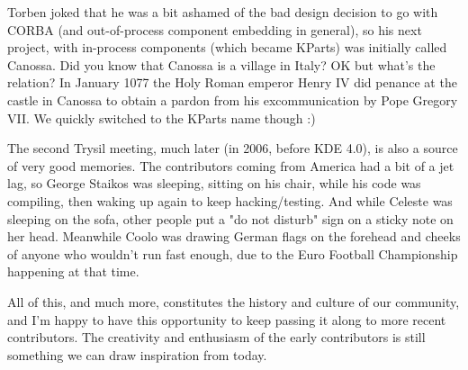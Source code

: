 Torben joked that he was a bit ashamed of the bad design decision to go with CORBA (and out-of-process component embedding in general), so his next project, with in-process components (which became KParts) was initially called Canossa. Did you know that Canossa is a village in Italy? OK but what's the relation? In January 1077 the Holy Roman emperor Henry IV did penance at the castle in Canossa to obtain a pardon from his excommunication by Pope Gregory VII. We quickly switched to the KParts name though :)

The second Trysil meeting, much later (in 2006, before KDE 4.0), is also a source of very good memories. The contributors coming from America had a bit of a jet lag, so George Staikos was sleeping, sitting on his chair, while his code was compiling, then waking up again to keep hacking/testing. And while Celeste was sleeping on the sofa, other people put a "do not disturb" sign on a sticky note on her head. Meanwhile Coolo was drawing German flags on the forehead and cheeks of anyone who wouldn't run fast enough, due to the Euro Football Championship happening at that time.

All of this, and much more, constitutes the history and culture of our community, and I'm happy to have this opportunity to keep passing it along to more recent contributors. The creativity and enthusiasm of the early contributors is still something we can draw inspiration from today.
